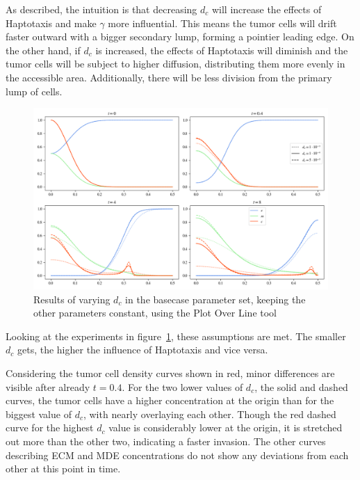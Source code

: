 As described, the intuition is that decreasing $d_c$ will increase the effects of Haptotaxis and make $\gamma$ more influential. This means the tumor cells will drift faster outward with a bigger secondary lump, forming a pointier leading edge. On the other hand, if $d_c$ is increased, the effects of Haptotaxis will diminish and the tumor cells will be subject to higher diffusion, distributing them more evenly in the accessible area. Additionally, there will be less division from the primary lump of cells. 
\begin{figure}[h!]
 \centering
 \includegraphics[width=\textwidth]{resources/images/dc_variation.png}
 \caption{Results of varying $d_c$ in the basecase parameter set, keeping the other parameters constant, using the Plot Over Line tool}
 \label{fig:dc_variation}
\end{figure}
Looking at the experiments in figure~\ref{fig:dc_variation}, these assumptions are met. The smaller $d_c$ gets, the higher the influence of Haptotaxis and vice versa.

Considering the tumor cell density curves shown in red, minor differences are visible after already $t=0.4$. For the two lower values of $d_c$, the solid and dashed curves, the tumor cells have a higher concentration at the origin than for the biggest value of $d_c$, with nearly overlaying each other. Though the red dashed curve for the highest $d_c$ value is considerably lower at the origin, it is stretched out more than the other two, indicating a faster invasion. The other curves describing ECM and MDE concentrations do not show any deviations from each other at this point in time.

